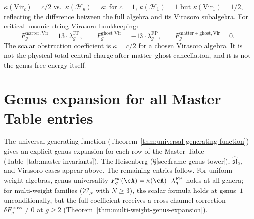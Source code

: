 \begin{remark}\label{rem:vir-bosonic-string-genus}

$\kappa(\mathrm{Vir}_c) = c/2$ vs.\
$\kappa(\mathcal{H}_\kappa) = \kappa$: for $c=1$,
$\kappa(\mathcal{H}_1) = 1$ but
$\kappa(\mathrm{Vir}_1) = 1/2$, reflecting the difference between the
full algebra and its Virasoro subalgebra. For critical bosonic-string
Virasoro bookkeeping:
\[
F_g^{\mathrm{matter,Vir}} = 13 \cdot \lambda_g^{\mathrm{FP}}, \qquad
F_g^{\mathrm{ghost,Vir}} = -13 \cdot \lambda_g^{\mathrm{FP}},
\qquad
F_g^{\mathrm{matter+ghost,Vir}} = 0.
\]
The scalar obstruction coefficient is $\kappa=c/2$ for a chosen
Virasoro algebra. It is not the physical total central charge after
matter--ghost cancellation, and it is not the genus free energy itself.
\end{remark}

\section{Genus expansion for all Master Table entries}\label{sec:genus-all-master}

The universal generating function
(Theorem~\ref{thm:universal-generating-function}) gives an explicit
genus expansion for each row of the Master Table
(Table~\ref{tab:master-invariants}). The Heisenberg
(\S\ref{sec:frame-genus-tower}), $\widehat{\mathfrak{sl}}_2$, and
Virasoro cases appear above. The remaining entries follow. For
uniform-weight
algebras, genus universality
$F_g^{\mathrm{sc}}(\cA)=\kappa(\cA) \cdot \lambda_g^{\mathrm{FP}}$
holds at all genera; for multi-weight families ($\mathcal{W}_N$
with $N \geq 3$), the scalar formula holds at genus~$1$
unconditionally, but the full coefficient receives a cross-channel correction
$\delta F_g^{\mathrm{cross}} \neq 0$ at $g \geq 2$
(Theorem~\ref{thm:multi-weight-genus-expansion}).

